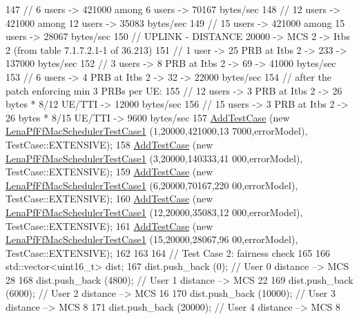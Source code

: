 \begin{DoxyCode}
147   \textcolor{comment}{// 6 users -> 421000 among 6 users -> 70167 bytes/sec}
148   \textcolor{comment}{// 12 users -> 421000 among 12 users -> 35083 bytes/sec}
149   \textcolor{comment}{// 15 users -> 421000 among 15 users -> 28067 bytes/sec}
150   \textcolor{comment}{// UPLINK - DISTANCE 20000 -> MCS 2 -> Itbs 2 (from table 7.1.7.2.1-1 of 36.213)}
151   \textcolor{comment}{// 1 user -> 25 PRB at Itbs 2 -> 233 -> 137000 bytes/sec}
152   \textcolor{comment}{// 3 users -> 8 PRB at Itbs 2 -> 69 -> 41000 bytes/sec}
153   \textcolor{comment}{// 6 users -> 4 PRB at Itbs 2 -> 32 -> 22000 bytes/sec}
154   \textcolor{comment}{// after the patch enforcing min 3 PRBs per UE:}
155   \textcolor{comment}{// 12 users -> 3 PRB at Itbs 2 -> 26 bytes * 8/12 UE/TTI -> 12000 bytes/sec}
156   \textcolor{comment}{// 15 users -> 3 PRB at Itbs 2 -> 26 bytes * 8/15 UE/TTI -> 9600 bytes/sec}
157   \hyperlink{classns3_1_1TestCase_a3718088e3eefd5d6454569d2e0ddd835}{AddTestCase} (\textcolor{keyword}{new} \hyperlink{classLenaPfFfMacSchedulerTestCase1}{LenaPfFfMacSchedulerTestCase1} (1,20000,421000,13
      7000,errorModel), TestCase::EXTENSIVE);
158   \hyperlink{classns3_1_1TestCase_a3718088e3eefd5d6454569d2e0ddd835}{AddTestCase} (\textcolor{keyword}{new} \hyperlink{classLenaPfFfMacSchedulerTestCase1}{LenaPfFfMacSchedulerTestCase1} (3,20000,140333,41
      000,errorModel), TestCase::EXTENSIVE);
159   \hyperlink{classns3_1_1TestCase_a3718088e3eefd5d6454569d2e0ddd835}{AddTestCase} (\textcolor{keyword}{new} \hyperlink{classLenaPfFfMacSchedulerTestCase1}{LenaPfFfMacSchedulerTestCase1} (6,20000,70167,220
      00,errorModel), TestCase::EXTENSIVE);
160   \hyperlink{classns3_1_1TestCase_a3718088e3eefd5d6454569d2e0ddd835}{AddTestCase} (\textcolor{keyword}{new} \hyperlink{classLenaPfFfMacSchedulerTestCase1}{LenaPfFfMacSchedulerTestCase1} (12,20000,35083,12
      000,errorModel), TestCase::EXTENSIVE);
161   \hyperlink{classns3_1_1TestCase_a3718088e3eefd5d6454569d2e0ddd835}{AddTestCase} (\textcolor{keyword}{new} \hyperlink{classLenaPfFfMacSchedulerTestCase1}{LenaPfFfMacSchedulerTestCase1} (15,20000,28067,96
      00,errorModel), TestCase::EXTENSIVE);
162 
163 
164   \textcolor{comment}{// Test Case 2: fairness check}
165 
166   std::vector<uint16\_t> dist;
167   dist.push\_back (0);    \textcolor{comment}{// User 0 distance --> MCS 28}
168   dist.push\_back (4800);    \textcolor{comment}{// User 1 distance --> MCS 22}
169   dist.push\_back (6000);    \textcolor{comment}{// User 2 distance --> MCS 16}
170   dist.push\_back (10000);    \textcolor{comment}{// User 3 distance --> MCS 8}
171   dist.push\_back (20000);    \textcolor{comment}{// User 4 distance --> MCS 8}

\end{DoxyCode}
